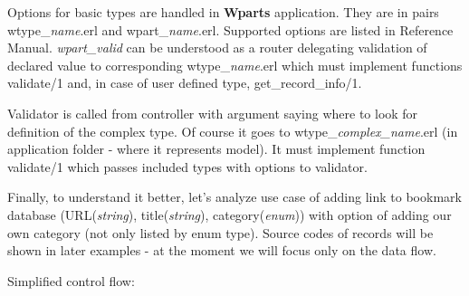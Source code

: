  Options for basic types are handled in {\bf Wparts} application. They are in pairs
 wtype\_\textit{name}.erl and wpart\_\textit{name}.erl. Supported  options are
 listed in Reference Manual. 
 {\it wpart\_valid} can be understood as a router delegating validation of declared
 value to corresponding wtype\_\textit{name}.erl which must implement functions
 validate/1 and, in case of user defined type, get\_record\_info/1.

 Validator is called from controller with argument saying where to look
 for definition of the complex type. Of course it goes to
 wtype\_\textit{complex\_name}.erl (in application folder - where it
 represents model). It must implement function validate/1 which passes 
included types with options to validator. 

 Finally, to understand it better, let's analyze use case of adding link to bookmark database
 (URL({\it string}), title({\it string}), category({\it enum})) with option of adding our own category (not only
 listed by enum type). Source codes of records will be shown in later examples - at
 the moment we will focus only on the data flow.

 Simplified control flow:

